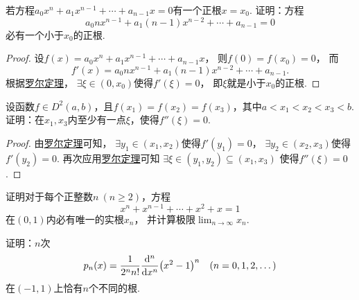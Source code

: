 \begin{example}\label{example:微分中值定理.一元高次方程的根的存在性}
若方程\(a_0 x^n + a_1 x^{n-1} + \dotsb + a_{n-1} x = 0\)有一个正根\(x = x_0\).
证明：方程\begin{equation*}
	a_0 n x^{n-1} + a_1 (n-1) x^{n-2} + \dotsb + a_{n-1} = 0
\end{equation*}必有一个小于\(x_0\)的正根.
\begin{proof}
设\(f(x) = a_0 x^n + a_1 x^{n-1} + \dotsb + a_{n-1} x\)，
则\(f(0) = f(x_0) = 0\)，
而\begin{equation*}
	f'(x) = a_0 n x^{n-1} + a_1 (n-1) x^{n-2} + \dotsb + a_{n-1}.
\end{equation*}
根据\hyperref[theorem:微分中值定理.罗尔定理]{罗尔定理}，
\(\exists \xi \in (0,x_0)\)使得\(f'(\xi) = 0\)，
即\(\xi\)就是小于\(x_0\)的正根.
\end{proof}
\end{example}
\begin{example}
设函数\(f \in D^2(a,b)\)，且\(f(x_1) = f(x_2) = f(x_3)\)，其中\(a < x_1 < x_2 < x_3 < b\).
证明：在\(x_1,x_3\)内至少有一点\(\xi\)，使得\(f''(\xi) = 0\).
\begin{proof}
由\hyperref[theorem:微分中值定理.罗尔定理]{罗尔定理}可知，
\(\exists y_1\in(x_1,x_2)\)使得\(f'(y_1) = 0\)，
\(\exists y_2\in(x_2,x_3)\)使得\(f'(y_2) = 0\).
再次应用\hyperref[theorem:微分中值定理.罗尔定理]{罗尔定理}可知
\(\exists \xi\in(y_1,y_2)\subseteq(x_1,x_3)\)
使得\(f''(\xi) = 0\).
\end{proof}
\end{example}
\begin{example}
证明对于每个正整数\(n\ (n\geq2)\)，方程\begin{equation*}
	x^n + x^{n-1} + \dotsb + x^2 + x = 1
\end{equation*}在\((0,1)\)内必有唯一的实根\(x_n\)，
并计算极限\(\lim_{n\to\infty} x_n\).
\end{example}

\begin{example}
证明：\(n\)次\begin{equation*}
	p_n(x) = \frac1{2^n n!} \dv[n]{x} (x^2-1)^n
	\quad(n=0,1,2,\dotsc)
\end{equation*}在\((-1,1)\)上恰有\(n\)个不同的根.
\end{example}

